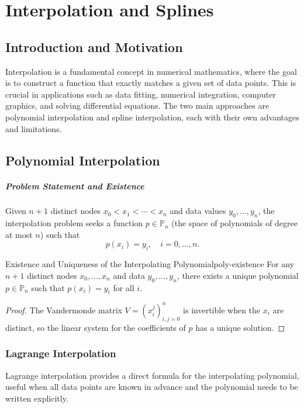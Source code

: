 \chapter{Interpolation and Splines}

\section*{Introduction and Motivation}
Interpolation is a fundamental concept in numerical mathematics, where the goal is to construct a function that exactly matches a given set of data points. This is crucial in applications such as data fitting, numerical integration, computer graphics, and solving differential equations. The two main approaches are polynomial interpolation and spline interpolation, each with their own advantages and limitations.

\section{Polynomial Interpolation}
\label{sec:poly-interp}

\paragraph{Problem Statement and Existence}
Given \(n+1\) distinct nodes \(x_0 < x_1 < \cdots < x_n\) and data values \(y_0, \ldots, y_n\), the interpolation problem seeks a function \(p \in \mathbb{P}_n\) (the space of polynomials of degree at most \(n\)) such that
\[
    p(x_i) = y_i, \quad i = 0, \ldots, n.
\]

\begin{theorem}{Existence and Uniqueness of the Interpolating Polynomial}{poly-existence}
    For any \(n+1\) distinct nodes \(x_0, \ldots, x_n\) and data \(y_0, \ldots, y_n\), there exists a unique polynomial \(p \in \mathbb{P}_n\) such that \(p(x_i) = y_i\) for all \(i\).
\end{theorem}
\begin{proof}
    The Vandermonde matrix \(V = (x_i^j)_{i,j=0}^n\) is invertible when the \(x_i\) are distinct, so the linear system for the coefficients of \(p\) has a unique solution.
\end{proof}

\subsection{Lagrange Interpolation}
Lagrange interpolation provides a direct formula for the interpolating polynomial, useful when all data points are known in advance and the polynomial needs to be written explicitly.


